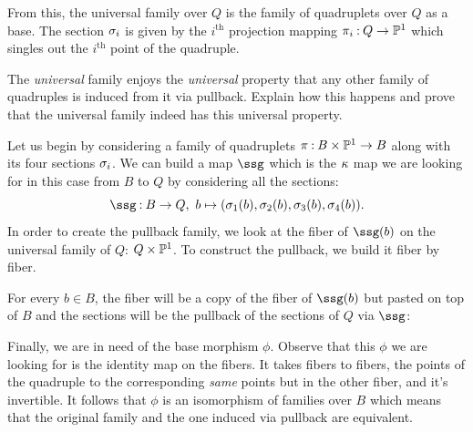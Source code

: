 \documentclass[12pt]{memoir}
\begin{document}
From this, the universal family over $Q$ is the family of quadruplets over $Q$ as a base. The section $\sigma_i$ is given by the $i^{\text{th}}$ projection mapping $\pi_i\mathbin{:} Q\to\mathbb{P}^1$ which singles out the $i^{\text{th}}$ point of the quadruple.

\begin{Ej}
    The \emph{universal} family enjoys the \emph{universal} property that any other family of quadruples is induced from it via pullback. Explain how this happens and prove that the universal family indeed has this universal property.
\end{Ej}

\begin{ptcb}
    Let us begin by considering a family of quadruplets $\pi\mathbin{:} B\times\mathbb{P}^1\to B$ along with its four sections $\sigma_i$. We can build a map $\ssg$ which is the $\kappa$ map we are looking for in this case from $B$ to $Q$ by considering all the sections:
    $$\ssg\:B\to Q,\ b\mapsto(\sg_1(b),\sg_2(b),\sg_3(b),\sg_4(b)).$$
    In order to create the pullback family, we look at the fiber of $\ssg(b)$ on the universal family of $Q$: $Q\times\mathbb{P}^1$. To construct the pullback, we build it fiber by fiber.\par 
    For every $b\in B$, the fiber will be a copy of the fiber of $\ssg(b)$ but pasted on top of $B$ and the sections will be the pullback of the sections of $Q$ via $\ssg$:
    \begin{center}
    \end{center}
Finally, we are in need of the base morphism $\phi$. Observe that this $\phi$ we are looking for is the identity map on the fibers. It takes fibers to fibers, the points of the quadruple to the corresponding \emph{same} points but in the other fiber, and it's invertible. It follows that $\phi$ is an isomorphism of families over $B$ which means that the original family and the one induced via pullback are equivalent.\par

\end{ptcb}
\end{document}
